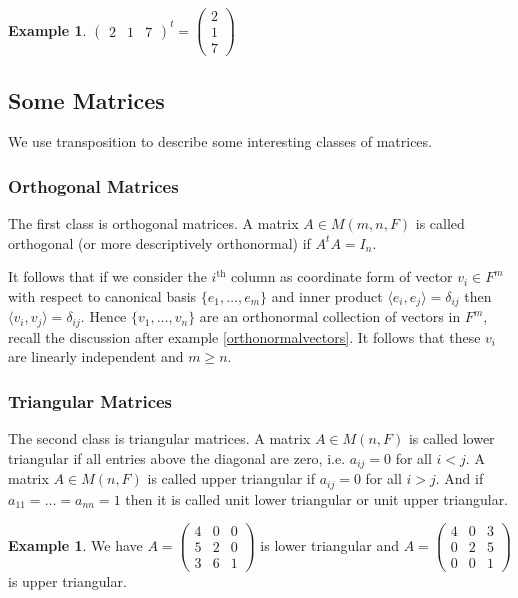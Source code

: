 \documentclass[12pt]{amsart}
\theoremstyle{definition}
\newtheorem{example}[theorem]{Example}
\begin{document}
\begin{example} $\left(\begin{array}{ccc} 2 & 1 & 7 \end{array}\right)^t = \left(\begin{array}{c} 2 \\ 1 \\ 7\end{array}\right)$
\end{example}

\subsection{Some Matrices} We use transposition to describe some interesting classes of matrices.

\subsubsection{Orthogonal Matrices} The first class is orthogonal matrices.
\dfn A matrix $A \in M(m, n,F)$ is called orthogonal (or more descriptively orthonormal) if $A^tA = I_n$.

It follows that if we consider the $i^{\text{th}}$ column as coordinate form of vector $v_i \in F^m$ with respect to canonical basis $\{e_1, \dots , e_m\}$ and inner product $\langle e_i, e_j \rangle = \delta_{ij}$ then $\langle v_i, v_j \rangle = \delta_{ij}$. Hence $\{v_1, \dots, v_n\}$ are an orthonormal collection of vectors in $F^m$, recall the discussion after example \ref{orthonormalvectors}. It follows that these $v_i$ are linearly independent and $m \geq n$.

\subsubsection{Triangular Matrices} The second class is triangular matrices.
\dfn A matrix $A \in M(n, F)$ is called lower triangular if all entries above the diagonal are zero, i.e. $a_{ij} = 0$ for all $i < j$. A matrix $A \in M(n, F)$ is called upper triangular if $a_{ij} = 0$ for all $i > j$. And if $a_{11} = \dots = a_{nn} = 1$ then it is called unit lower triangular or unit upper triangular.

\begin{example} We have $A = \left(\begin{array}{ccc} 4 & 0 & 0 \\ 5 & 2 & 0 \\ 3 & 6 & 1 \end{array}\right)$ is lower triangular and $A = \left(\begin{array}{ccc} 4 & 0 & 3 \\ 0 & 2 & 5 \\ 0 & 0 & 1 \end{array}\right)$ is upper triangular.
\end{example}
\end{document}
